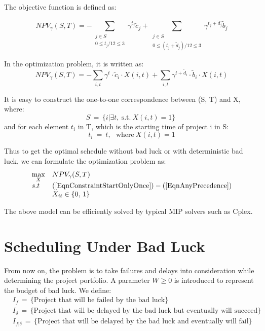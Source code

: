 \documentclass[final,3p,times]{elsarticle}
\begin{document}
	The objective function is defined as:

	\begin{equation}
		NPV_{\gamma} ( S,T ) = - \sum\limits_{\substack{j \in S\\0 \leq t_j/12 \leq 3}} \gamma^{t_j} \tilde{c}_j + \sum\limits_{\substack{j \in S\\0 \leq (t_j+\tilde{d}_j)/12 \leq 3}} \gamma^{t_j+\tilde{d}_j} \tilde{b}_j
	\end{equation}
	
	In the optimization problem, it is written as:
	\begin{equation}
		NPV_{\gamma} ( S,T ) = - \sum\limits_{i,t} \gamma^t \cdot \tilde{c}_i \cdot X(i,t) + \sum\limits_{i,t} \gamma^{t+\tilde{d}_i} \cdot \tilde{b}_i \cdot X(i,t)
	\end{equation}
	
	It is easy to construct the one-to-one correspondence between (S, T) and X, where:
	\begin{equation}
		S\,=\,\{i | \exists t,~\mbox{s.t.}~X(i,t)=1\}\;
	\end{equation}
	and for each element $t_i$ in T, which is the starting time of project i in S:
	\begin{equation}
		t_i~=~t ,~~~\mbox{where}~ X(i,t)=1
	\end{equation}
	
	Thus to get the optimal schedule without bad luck or with deterministic bad luck, we can formulate the optimization problem as:
	\begin{equation}
		\begin{array}{ll}
			\max\limits_{X} &NPV_\gamma(S,T)\\
			s.t &(\ref{EqnConstraintStartOnlyOnce}) -(\ref{EqnAnyPrecedence})\\
			& X_{it} \in \{0,\,1\}
		\end{array}
	\end{equation}
	
	The above model can be efficiently solved by typical MIP solvers such as Cplex.

\section{Scheduling Under Bad Luck}
	From now on, the problem is to take failures and delays into consideration while determining the project portfolio. A parameter $W\geq 0$ is introduced to represent the budget of bad luck. We define:
	\begin{align*}
		&I_f\,=\, \{\mbox{Project that will be failed by the bad luck}\}\\
		&I_{\delta}\,=\, \{\mbox{Project that will be delayed by the bad luck but eventually will succeed}\}\\
		&I_{f|\delta}\,=\, \{\mbox{Project that will be delayed by the bad luck and eventually will fail}\}\\
	\end{align*}
	
\end{document}
